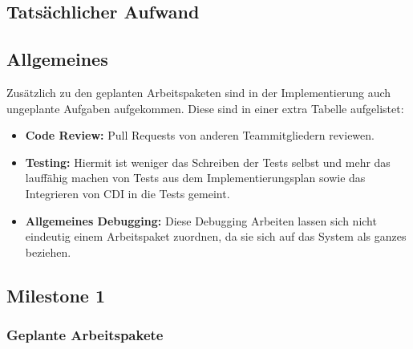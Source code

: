 \begin{landscape}
	
	\section{Tatsächlicher Aufwand}\label{sec:aufwand}
	
	\subsection{Allgemeines}
	
	Zusätzlich zu den geplanten Arbeitspaketen sind in der Implementierung auch ungeplante Aufgaben aufgekommen. Diese sind in einer extra Tabelle aufgelistet:
	\begin{itemize}
		\item \textbf{Code Review:} Pull Requests von anderen Teammitgliedern reviewen.
		\item \textbf{Testing:} Hiermit ist weniger das Schreiben der Tests selbst und mehr das lauffähig machen von Tests aus dem Implementierungsplan sowie das Integrieren von CDI in die Tests gemeint.
		\item \textbf{Allgemeines Debugging:} Diese Debugging Arbeiten lassen sich nicht eindeutig einem Arbeitspaket zuordnen, da sie sich auf das System als ganzes beziehen.
	\end{itemize}

	\subsection{Milestone 1}
	\subsubsection{Geplante Arbeitspakete}
\end{landscape}
